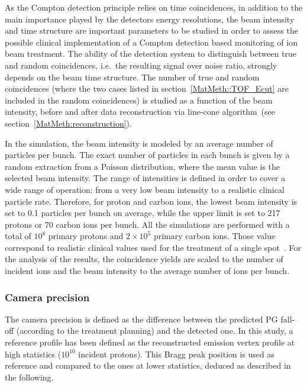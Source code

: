 As the Compton detection principle relies on time coincidences, in addition to the main importance played by the detectors energy resolutions, the beam intensity and time structure are important parameters to be studied in order to assess the possible clinical implementation of a Compton detection based monitoring of ion beam treatment. The ability of the detection system to distinguish between true and random coincidences, i.e.~the resulting signal over noise ratio, strongly depends on the beam time structure. The number of true and random coincidences (where the two cases listed in section~\ref{MatMeth::TOF_Ecut} are included in the random coincidences) is studied as a function of the beam intensity, before and after data reconstruction via line-cone algorithm~(see section~\ref{MatMeth:reconstruction}).

In the simulation, the beam intensity is modeled by an average number of particles per bunch. The exact number of particles in each bunch is given by a random extraction from a Poisson distribution, where the mean value is the selected beam intensity. The range of intensities is defined in order to cover a wide range of operation: from a very low beam intensity to a realistic clinical particle rate. Therefore, for proton and carbon ions, the lowest beam intensity is set to 0.1 particles per bunch on average, while the upper limit is set to 217 protons or 70 carbon ions per bunch. All the simulations are performed with a total of $10^{8}$ primary protons and  $2\times10^{5}$ primary carbon ions. Those value correspond to realistic clinical values used for the treatment of a single spot~\cite{Grevillot_2011}. For the analysis of the results, the coincidence yields are scaled to the number of incident ions and the beam intensity to the average number of ions per bunch.

\subsubsection{Camera precision}
\label{MatMeth:precision}

The camera precision is defined as the difference between the predicted PG fall-off (according to the treatment planning) and the detected one.
In this study, a reference profile has been defined as the reconstructed emission vertex profile at high statistics ($\mathrm{10^{10}}$ incident protons). This Bragg peak position is used as reference and compared to the ones at lower statistics, deduced as described in the following.

